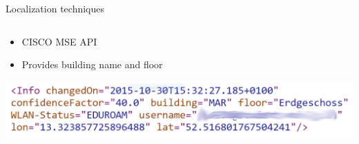 \documentclass[11pt]{beamer}
\begin{document}
\begin{frame}{Localization techniques}
\begin{columns}
\begin{column}{0.8\textwidth}
    \end{column}

  \end{columns}

  \vspace{0.5cm}

  \begin{itemize}
    \setlength{\itemsep}{1.5ex}
    \item CISCO MSE API
    \item Provides building name and floor
  \end{itemize}

  \vspace{0.25cm}

  \begin{center}
	\includegraphics[width=\textwidth]{tubitapi_response}
   \end{center}

\end{frame}
\end{document}
